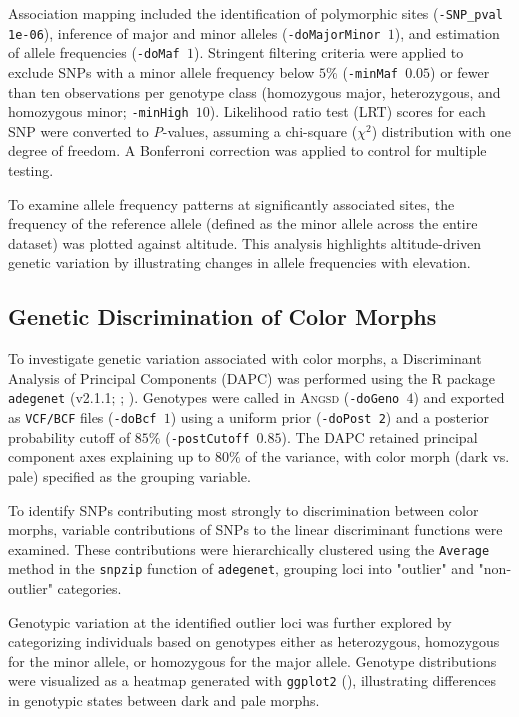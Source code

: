 \documentclass[9pt,a4paper,twoside]{rho-class/rho}
\begin{document}
        Association mapping included the identification of polymorphic sites (\texttt{-SNP\_pval 1e-06}), inference of major and minor alleles (\texttt{-doMajorMinor $1$}), and estimation of allele frequencies (\texttt{-doMaf $1$}). Stringent filtering criteria were applied to exclude SNPs with a minor allele frequency below $5\%$ (\texttt{-minMaf $0.05$}) or fewer than ten observations per genotype class (homozygous major, heterozygous, and homozygous minor; \texttt{-minHigh $10$}). Likelihood ratio test (LRT) scores for each SNP were converted to \textit{P}-values, assuming a chi-square ($\chi^2$) distribution with one degree of freedom. A Bonferroni correction was applied to control for multiple testing.
        
        To examine allele frequency patterns at significantly associated sites, the frequency of the reference allele (defined as the minor allele across the entire dataset) was plotted against altitude. This analysis highlights altitude-driven genetic variation by illustrating changes in allele frequencies with elevation.

    \subsection{Genetic Discrimination of Color Morphs}
        To investigate genetic variation associated with color morphs, a Discriminant Analysis of Principal Components (DAPC) was performed using the R package \texttt{adegenet} (v2.1.1; \cite{Jombart2008}; \cite{Jombart2011}). Genotypes were called in \textsc{Angsd} (\texttt{-doGeno $4$}) and exported as \texttt{VCF/BCF} files (\texttt{-doBcf $1$}) using a uniform prior (\texttt{-doPost 2}) and a posterior probability cutoff of $85\%$ (\texttt{-postCutoff $0.85$}). The DAPC retained principal component axes explaining up to $80\%$ of the variance, with color morph (dark vs. pale) specified as the grouping variable.
        
        To identify SNPs contributing most strongly to discrimination between color morphs, variable contributions of SNPs to the linear discriminant functions were examined. These contributions were hierarchically clustered using the \texttt{Average} method in the \texttt{snpzip} function of \texttt{adegenet}, grouping loci into "outlier" and "non-outlier" categories.
        
        Genotypic variation at the identified outlier loci was further explored by categorizing individuals based on genotypes either as heterozygous, homozygous for the minor allele, or homozygous for the major allele. Genotype distributions were visualized as a heatmap generated with \texttt{ggplot2} (\cite{ggplot2}), illustrating differences in genotypic states between dark and pale morphs.
\end{document}
